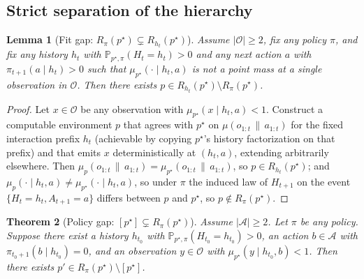 \documentclass[11pt]{article}
\newtheorem{theorem}{Theorem}[section]
\newtheorem{lemma}[theorem]{Lemma}
\theoremstyle{definition}
\theoremstyle{remark}
\newcommand{\Acal}{\mathcal{A}}
\newcommand{\Ocal}{\mathcal{O}}
\newcommand{\Prob}{\mathbb{P}}
\newcommand{\givena}{\,\|\,}
\begin{document}
\subsection{Strict separation of the hierarchy}

\begin{lemma}[{Fit gap: $R_\pi(p^\star)\subsetneq R_{h_t}(p^\star)$}]
\label{lem:fit-gap}
Assume $|\Ocal|\ge 2$, fix any policy $\pi$, and fix any history $h_t$ with $\Prob_{p^\star,\pi}(H_t=h_t)>0$ and any next action $a$ with $\pi_{t+1}(a\mid h_t)>0$ such that $\mu_{p^\star}(\cdot\mid h_t,a)$ is not a point mass at a single observation in $\Ocal$. Then there exists $p\in R_{h_t}(p^\star)\setminus R_\pi(p^\star)$.
\end{lemma}

\begin{proof}
Let $x\in\Ocal$ be any observation with $\mu_{p^\star}(x\mid h_t,a)<1$. Construct a computable environment $p$ that agrees with $p^\star$ on $\mu(o_{1:t}\givena a_{1:t})$ for the fixed interaction prefix $h_t$ (achievable by copying $p^\star$'s history factorization on that prefix) and that emits $x$ deterministically at $(h_t,a)$, extending arbitrarily elsewhere. Then $\mu_p(o_{1:t}\givena a_{1:t})=\mu_{p^\star}(o_{1:t}\givena a_{1:t})$, so $p\in R_{h_t}(p^\star)$; and $\mu_p(\cdot\mid h_t,a)\neq \mu_{p^\star}(\cdot\mid h_t,a)$, so under $\pi$ the induced law of $H_{t+1}$ on the event $\{H_t=h_t,A_{t+1}=a\}$ differs between $p$ and $p^\star$, so $p\notin R_\pi(p^\star)$.
\end{proof}

\begin{theorem}[{Policy gap: $[p^\star]\subsetneq R_\pi(p^\star)$}]
\label{thm:policy-gap}
Assume $|\Acal|\ge 2$. Let $\pi$ be any policy. Suppose there exist a history $h_{t_0}$ with $\Prob_{p^\star,\pi}(H_{t_0}=h_{t_0})>0$, an action $b\in\Acal$ with $\pi_{t_0+1}(b\mid h_{t_0})=0$, and an observation $y\in\Ocal$ with $\mu_{p^\star}(y\mid h_{t_0},b)<1$. Then there exists $p'\in R_\pi(p^\star)\setminus [p^\star]$.
\end{theorem}
\end{document}
